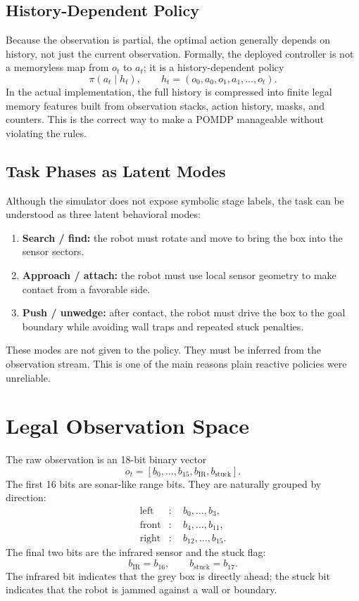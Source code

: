 \documentclass[11pt]{article}
\begin{document}
\subsection{History-Dependent Policy}

Because the observation is partial, the optimal action generally depends on history, not
just the current observation. Formally, the deployed controller is not a memoryless map
from \(o_t\) to \(a_t\); it is a history-dependent policy
\[
  \pi(a_t\mid h_t),
  \qquad
  h_t=(o_0,a_0,o_1,a_1,\dots,o_t).
\]
In the actual implementation, the full history is compressed into finite legal memory
features built from observation stacks, action history, masks, and counters. This is the
correct way to make a POMDP manageable without violating the rules.

\subsection{Task Phases as Latent Modes}

Although the simulator does not expose symbolic stage labels, the task can be understood
as three latent behavioral modes:
\begin{enumerate}[leftmargin=1.5em]
  \item \textbf{Search / find:} the robot must rotate and move to bring the box into the
  sensor sectors.
  \item \textbf{Approach / attach:} the robot must use local sensor geometry to make
  contact from a favorable side.
  \item \textbf{Push / unwedge:} after contact, the robot must drive the box to the goal
  boundary while avoiding wall traps and repeated stuck penalties.
\end{enumerate}
These modes are not given to the policy. They must be inferred from the observation
stream. This is one of the main reasons plain reactive policies were unreliable.

\section{Legal Observation Space}

The raw observation is an 18-bit binary vector
\[
  o_t=[b_0,\ldots,b_{15},b_{\text{IR}},b_{\text{stuck}}].
\]
The first 16 bits are sonar-like range bits. They are naturally grouped by direction:
\[
\begin{aligned}
  \text{left}  &: \quad b_0,\ldots,b_3,\\
  \text{front} &: \quad b_4,\ldots,b_{11},\\
  \text{right} &: \quad b_{12},\ldots,b_{15}.
\end{aligned}
\]
The final two bits are the infrared sensor and the stuck flag:
\[
  b_{\text{IR}}=b_{16},
  \qquad
  b_{\text{stuck}}=b_{17}.
\]
The infrared bit indicates that the grey box is directly ahead; the stuck bit indicates
that the robot is jammed against a wall or boundary.
\end{document}
